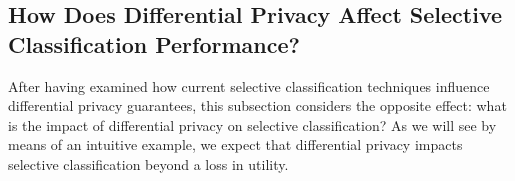 \subsection{How Does Differential Privacy Affect Selective Classification Performance?} 
\label{sec:dp_affects_sc}

After having examined how current selective classification techniques influence differential privacy guarantees, this subsection considers the opposite effect: what is the impact of differential privacy on selective classification? As we will see by means of an intuitive example, we expect that differential privacy impacts selective classification beyond a loss in utility.



